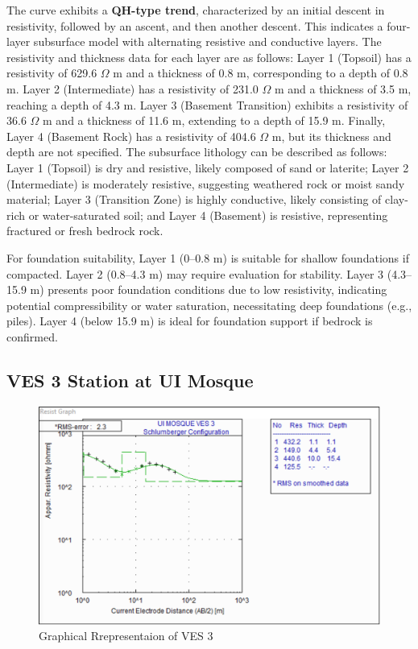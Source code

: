 \documentclass[12pt,a4paper]{report}
\begin{document}
The curve exhibits a \textbf{QH-type trend}, characterized by an initial descent in resistivity, followed by an ascent, and then another descent. This indicates a four-layer subsurface model with alternating resistive and conductive layers. The resistivity and thickness data for each layer are as follows: Layer 1 (Topsoil) has a resistivity of 629.6 $\Omega$ m and a thickness of 0.8 m, corresponding to a depth of 0.8 m. Layer 2 (Intermediate) has a resistivity of 231.0 $\Omega$ m and a thickness of 3.5 m, reaching a depth of 4.3 m. Layer 3 (Basement Transition) exhibits a resistivity of 36.6 $\Omega$ m and a thickness of 11.6 m, extending to a depth of 15.9 m. Finally, Layer 4 (Basement Rock) has a resistivity of 404.6 $\Omega$ m, but its thickness and depth are not specified. The subsurface lithology can be described as follows: Layer 1 (Topsoil) is dry and resistive, likely composed of sand or laterite; Layer 2 (Intermediate) is moderately resistive, suggesting weathered rock or moist sandy material; Layer 3 (Transition Zone) is highly conductive, likely consisting of clay-rich or water-saturated soil; and Layer 4 (Basement) is resistive, representing fractured or fresh bedrock rock.

For foundation suitability, Layer 1 (0--0.8 m) is suitable for shallow foundations if compacted. Layer 2 (0.8--4.3 m) may require evaluation for stability. Layer 3 (4.3--15.9 m) presents poor foundation conditions due to low resistivity, indicating potential compressibility or water saturation, necessitating deep foundations (e.g., piles). Layer 4 (below 15.9 m) is ideal for foundation support if bedrock is confirmed.
\subsection{VES 3 Station at UI Mosque}

\begin{figure}[H]
    \centering
    \includegraphics[width=1.0\textwidth]{ui_ves3.png}
    \caption{Graphical Rrepresentaion of VES 3}
    \label{fig:VES_3_Curve}
\end{figure}
\end{document}
